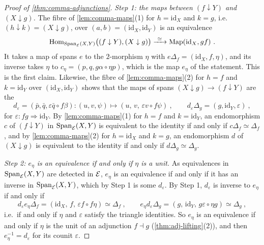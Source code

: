 \begin{proof}[Proof of \cref{thm:comma-adjunctions}]
%
\emph{Step 1: the maps between $(f \downarrow Y)$ and $(X \downarrow g)$.}
The fibre of \cref{lem:comma-maps}(1) for $h = \mathrm{id}_{X}$ and $k = g$,
i.e.\
$(h \downarrow k) = (X \downarrow g)$,
over
$(a,b) = (\mathrm{id}_{X},\mathrm{id}_{Y})$
is an equivalence
\begin{equation*}
\operatorname{Hom}_{\mathrm{Span}_{\mathcal{E}}(X,Y)}\bigl((f \downarrow Y),(X \downarrow g)\bigr)
\xrightarrow{\ \simeq\ } \operatorname{Map}(\mathrm{id}_{X},gf) \ .
\end{equation*}
It takes a map of spans $e$ to the $2$-morphism $\eta$ with
$e\Delta_{f} = (\mathrm{id}_{X},f,\eta)$,
and its inverse takes $\eta$ to
$c_{\eta} = (p,q,g\alpha \circ \eta p)$,
which is the map $e_{\eta}$ of the statement. This is the first claim.
Likewise, the fibre of \cref{lem:comma-maps}(2) for $h = f$ and
$k = \mathrm{id}_{Y}$
over
$(\mathrm{id}_{X},\mathrm{id}_{Y})$
shows that the maps of spans
$(X \downarrow g) \to (f \downarrow Y)$
are the
\begin{equation*}
d_{\varepsilon} = (\bar p,\bar q,\varepsilon\bar q \circ f\beta)\colon
(u,v,\psi) \mapsto (u,\,v,\,\varepsilon v \circ f\psi) \ , \qquad
d_{\varepsilon}\Delta_{g} = (g,\mathrm{id}_{Y},\varepsilon) \ ,
\end{equation*}
for
$\varepsilon\colon fg \Rightarrow \mathrm{id}_{Y}$.
By \cref{lem:comma-maps}(1) for $h = f$ and $k = \mathrm{id}_{Y}$, an
endomorphism $c$ of $(f \downarrow Y)$ in $\mathrm{Span}_{\mathcal{E}}(X,Y)$ is equivalent to
the identity if and only if
$c\Delta_{f} \simeq \Delta_{f}$,
and by \cref{lem:comma-maps}(2) for $h = \mathrm{id}_{X}$ and $k = g$, an
endomorphism $d$ of $(X \downarrow g)$ is equivalent to the identity if and only
if
$d\Delta_{g} \simeq \Delta_{g}$.

\emph{Step 2: $e_{\eta}$ is an equivalence if and only if $\eta$ is a unit.} As
equivalences in $\mathrm{Span}_{\mathcal{E}}(X,Y)$ are detected in $\mathcal{E}$,
$e_{\eta}$ is an equivalence if and only if it has an inverse in
$\mathrm{Span}_{\mathcal{E}}(X,Y)$, which by Step 1 is some $d_{\varepsilon}$. By Step 1,
$d_{\varepsilon}$ is inverse to $e_{\eta}$ if and only if
\begin{equation*}
d_{\varepsilon}e_{\eta}\Delta_{f} = (\mathrm{id}_{X},\,f,\,\varepsilon f \circ
f\eta) \simeq \Delta_{f} \ , \qquad e_{\eta}d_{\varepsilon}\Delta_{g} =
(g,\,\mathrm{id}_{Y},\,g\varepsilon \circ \eta g) \simeq \Delta_{g} \ ,
\end{equation*}
i.e.\ if and only if $\eta$ and $\varepsilon$ satisfy the triangle identities.
So $e_{\eta}$ is an equivalence if and only if $\eta$ is the unit of an
adjunction $f \dashv g$ (\cref{thm:adj-lifting}(2)), and then
$e_{\eta}^{-1} = d_{\varepsilon}$
for its counit $\varepsilon$.


\end{proof}

